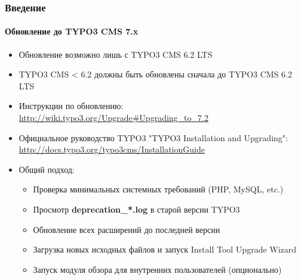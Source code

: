 \begin{frame}[fragile]
	\frametitle{Введение}
	\framesubtitle{Обновление до TYPO3 CMS 7.x}

	\begin{itemize}
		\item Обновление возможно лишь с TYPO3 CMS 6.2 LTS
		\item TYPO3 CMS < 6.2 должны быть обновлены сначала до TYPO3 CMS 6.2 LTS
		\item Инструкции по обновлению:\newline
			\smaller\url{http://wiki.typo3.org/Upgrade#Upgrading_to_7.2}\normalsize
		\item Официальное руководство TYPO3 "TYPO3 Installation and Upgrading":
			\smaller\url{http://docs.typo3.org/typo3cms/InstallationGuide}\normalsize
		\item Общий подход:
			\begin{itemize}
				\item \smaller Проверка минимальных системных требований \small(PHP, MySQL, etc.) \normalsize
				\item \smaller Просмотр \textbf{deprecation\_*.log} в старой версии TYPO3 \normalsize
				\item \smaller Обновление всех расширений до последней версии \normalsize
				\item \smaller Загрузка новых исходных файлов и запуск Install Tool \textrightarrow Upgrade Wizard \normalsize
				\item \smaller Запуск модуля обзора для внутренних пользователей (опционально) \normalsize
			\end{itemize}
	\end{itemize}

\end{frame}

